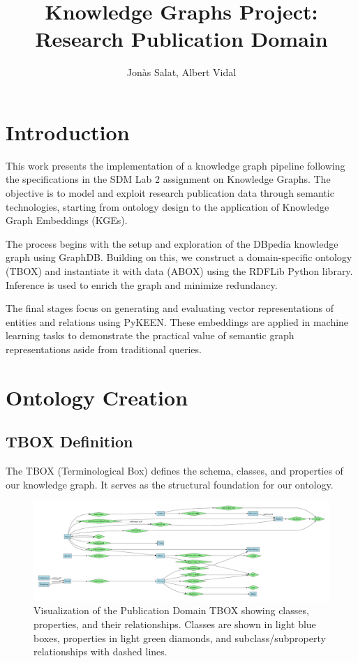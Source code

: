 \documentclass[10pt,a4paper]{article}
\title{Knowledge Graphs Project: Research Publication Domain}
\author{Jonàs Salat, Albert Vidal}
\begin{document}
\maketitle

\section{Introduction}

This work presents the implementation of a knowledge graph pipeline following the specifications in the SDM Lab 2 assignment on Knowledge Graphs. The objective is to model and exploit research publication data through semantic technologies, starting from ontology design to the application of Knowledge Graph Embeddings (KGEs).

The process begins with the setup and exploration of the DBpedia knowledge graph using GraphDB. Building on this, we construct a domain-specific ontology (TBOX) and instantiate it with data (ABOX) using the RDFLib Python library. Inference is used to enrich the graph and minimize redundancy.

The final stages focus on generating and evaluating vector representations of entities and relations using PyKEEN. These embeddings are applied in machine learning tasks to demonstrate the practical value of semantic graph representations aside from traditional queries.

\section{Ontology Creation}
\subsection{TBOX Definition}
The TBOX (Terminological Box) defines the schema, classes, and properties of our knowledge graph. It serves as the structural foundation for our ontology.

\begin{figure}[H]
    \centering
    \includegraphics[width=\textwidth]{img/publication_tbox.pdf}
    \caption{Visualization of the Publication Domain TBOX showing classes, properties, and their relationships. Classes are shown in light blue boxes, properties in light green diamonds, and subclass/subproperty relationships with dashed lines.}
    \label{fig:tbox}
\end{figure}
\end{document}
